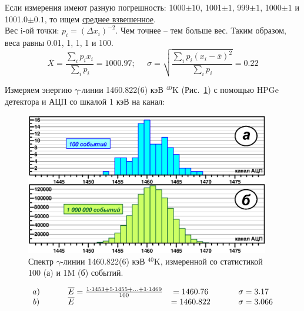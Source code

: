 Если измерения имеют разную погрешность: 1000$\pm10$, 1001$\pm1$, 999$\pm1$, 1000$\pm1$ и 1001.0$\pm0.1$, то ищем \underline{среднее взвешенное}. \\
Вес i-ой точки: $p_i = \left(\Delta x_i\right)^{-2}$. Чем точнее -- тем больше вес.  Таким образом, веса равны 0.01, 1, 1, 1 и 100.
 \begin{displaymath}
\overline{X}=\frac{\sum_i p_ix_i}{\sum_i p_i}=1000.97;\;\;\;\;\;
\sigma=\sqrt{\frac{\sum_i p_i\left(x_i-\overline{x}\right)^2}{\sum_i p_i}}=0.22
 \end{displaymath}

Измеряем энергию $\gamma$-линии 1460.822(6) кэВ $^{40}$K (Рис.~\ref{fig:k40_spk}) с помощью HPGe детектора и АЦП со шкалой 1 кэВ на канал:

 \begin{figure}[ht]
\centering
 \includegraphics[width=0.95\textwidth]{GP001/GP001F01.eps}
 
  \caption{Спектр $\gamma$-линии 1460.822(6) кэВ $^{40}$K, измеренной со статистикой 100 (а) и 1M (б) событий.}
   \label{fig:k40_spk} %
\end{figure}

 \begin{displaymath}
 \begin{array}{cclcll}
 a)&\hspace{5mm}&\overline{E} = \frac{1\cdot1453 + 5\cdot1455 +  \ldots
 + 1\cdot1469}{100}           & = 1460.76  &\hspace{5mm}&\sigma = 3.17\\
 b)&            &\overline{E} & = 1460.822 &            &\sigma = 3.066
 \end{array}
  \end{displaymath}

